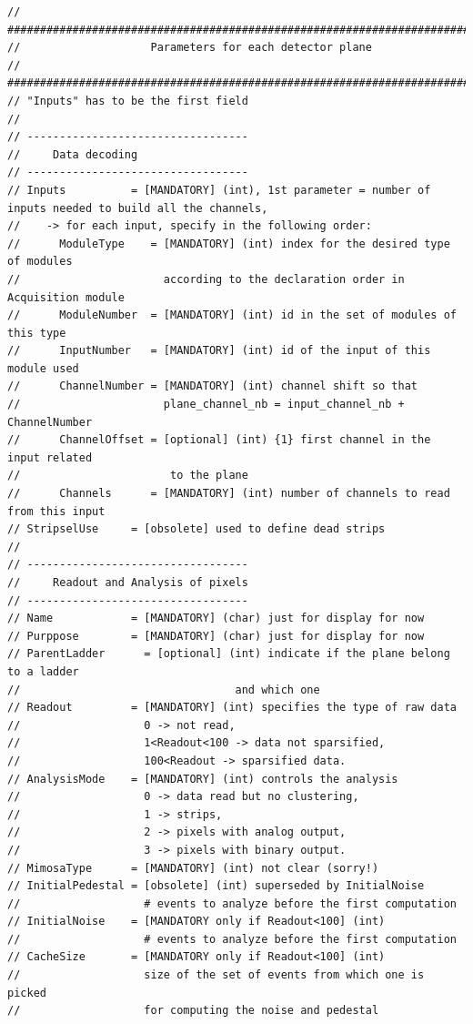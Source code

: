 \documentclass[a4paper, 12pt, twoside]{article}
\begin{document}
\begin{verbatim}
// #############################################################################
//                    Parameters for each detector plane
// #############################################################################
// "Inputs" has to be the first field
//
// ----------------------------------
//     Data decoding
// ----------------------------------
// Inputs          = [MANDATORY] (int), 1st parameter = number of inputs needed to build all the channels,
//    -> for each input, specify in the following order:
//      ModuleType    = [MANDATORY] (int) index for the desired type of modules 
//                      according to the declaration order in Acquisition module
//      ModuleNumber  = [MANDATORY] (int) id in the set of modules of this type
//      InputNumber   = [MANDATORY] (int) id of the input of this module used
//      ChannelNumber = [MANDATORY] (int) channel shift so that 
//                      plane_channel_nb = input_channel_nb + ChannelNumber
//      ChannelOffset = [optional] (int) {1} first channel in the input related 
//                       to the plane
//      Channels      = [MANDATORY] (int) number of channels to read from this input
// StripselUse     = [obsolete] used to define dead strips
//
// ----------------------------------
//     Readout and Analysis of pixels
// ----------------------------------
// Name            = [MANDATORY] (char) just for display for now
// Purppose        = [MANDATORY] (char) just for display for now
// ParentLadder      = [optional] (int) indicate if the plane belong to a ladder
//                                 and which one
// Readout         = [MANDATORY] (int) specifies the type of raw data
//                   0 -> not read,
//                   1<Readout<100 -> data not sparsified,
//                   100<Readout -> sparsified data.
// AnalysisMode    = [MANDATORY] (int) controls the analysis
//                   0 -> data read but no clustering,
//                   1 -> strips,
//                   2 -> pixels with analog output,
//                   3 -> pixels with binary output.
// MimosaType      = [MANDATORY] (int) not clear (sorry!)
// InitialPedestal = [obsolete] (int) superseded by InitialNoise
//                   # events to analyze before the first computation
// InitialNoise    = [MANDATORY only if Readout<100] (int)
//                   # events to analyze before the first computation
// CacheSize       = [MANDATORY only if Readout<100] (int) 
//                   size of the set of events from which one is picked 
//                   for computing the noise and pedestal

\end{verbatim}
\end{document}
